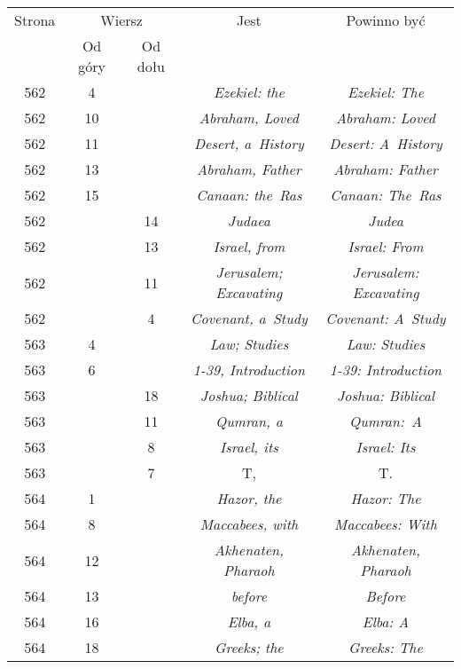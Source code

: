 \documentclass[a4paper,11pt]{article}
\begin{document}
\begin{center}
  \begin{tabular}{|c|c|c|c|c|}
    \hline
    Strona & \multicolumn{2}{c|}{Wiersz} & Jest
                              & Powinno być \\ \cline{2-3}
    & Od góry & Od dołu & & \\
    \hline
    562 & \hphantom{0}4 & & \textit{Ezekiel: the} & \textit{Ezekiel: The} \\
    562 & 10 & & \textit{Abraham, Loved} & \textit{Abraham: Loved} \\
    562 & 11 & & \textit{Desert, a~History} & \textit{Desert: A~History} \\
    562 & 13 & & \textit{Abraham, Father} & \textit{Abraham: Father} \\
    562 & 15 & & \textit{Canaan: the~Ras} & \textit{Canaan: The~Ras} \\
    562 & & 14 & \textit{Judaea} & \textit{Judea} \\
    562 & & 13 & \textit{Israel, from} & \textit{Israel: From} \\
    562 & & 11 & \textit{Jerusalem; Excavating}
           & \textit{Jerusalem: Excavating} \\
    562 & & \hphantom{0}4 & \textit{Covenant, a~Study}
    & \textit{Covenant: A~Study} \\
    563 & \hphantom{0}4 & & \textit{Law; Studies} & \textit{Law: Studies} \\
    563 & \hphantom{0}6 & & \textit{1-39, Introduction}
           & \textit{1-39: Introduction} \\
    563 & & 18 & \textit{Joshua; Biblical} & \textit{Joshua: Biblical} \\
    563 & & 11 & \textit{Qumran, a} & \textit{Qumran:~A} \\
    563 & & \hphantom{0}8 & \textit{Israel, its} & \textit{Israel: Its} \\
    563 & & \hphantom{0}7 & T, & T. \\
    564 & \hphantom{0}1 & & \textit{Hazor, the} & \textit{Hazor: The} \\
    564 & \hphantom{0}8 & & \textit{Maccabees, with}
    & \textit{Maccabees: With} \\
    564 & 12 & & \textit{Akhenaten, Pharaoh}
           & \textit{Akhenaten, Pharaoh} \\
    564 & 13 & & \textit{before} & \textit{Before} \\
    564 & 16 & & \textit{Elba, a} & \textit{Elba: A} \\
    564 & 18 & & \textit{Greeks; the} & \textit{Greeks: The} \\

\end{tabular}
\end{center}
\end{document}
